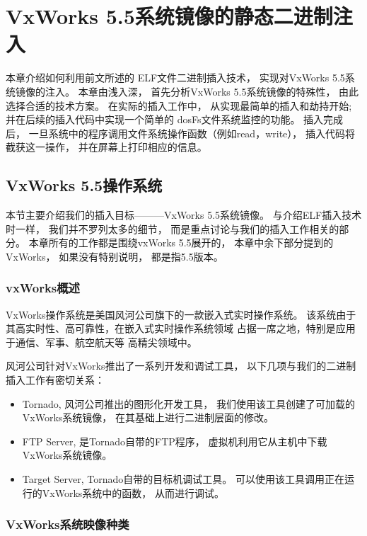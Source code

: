 \chapter{VxWorks 5.5系统镜像的静态二进制注入}

本章介绍如何利用前文所述的
ELF文件二进制插入技术，
实现对VxWorks 5.5系统镜像的注入。
本章由浅入深，
首先分析VxWorks 5.5系统镜像的特殊性，
由此选择合适的技术方案。
在实际的插入工作中，
从实现最简单的插入和劫持开始;
并在后续的插入代码中实现一个简单的
dosFs文件系统监控的功能。
插入完成后，
一旦系统中的程序调用文件系统操作函数（例如read，write），
插入代码将截获这一操作，
并在屏幕上打印相应的信息。


\section{VxWorks 5.5操作系统}

本节主要介绍我们的插入目标———VxWorks 5.5系统镜像。
与介绍ELF插入技术时一样，
我们并不罗列太多的细节，
而是重点讨论与我们的插入工作相关的部分。
本章所有的工作都是围绕vxWorks 5.5展开的，
本章中余下部分提到的VxWorks，
如果没有特别说明，
都是指5.5版本。


\subsection{vxWorks概述}

VxWorks操作系统是美国风河公司旗下的一款嵌入式实时操作系统。
该系统由于其高实时性、高可靠性，在嵌入式实时操作系统领域
占据一席之地，特别是应用于通信、军事、航空航天等
高精尖领域中。

风河公司针对VxWorks推出了一系列开发和调试工具，
以下几项与我们的二进制插入工作有密切关系：

\begin{itemize}
 \item Tornado, 风河公司推出的图形化开发工具，
我们使用该工具创建了可加载的VxWorks系统镜像，
在其基础上进行二进制层面的修改。
 \item FTP Server, 是Tornado自带的FTP程序，
虚拟机利用它从主机中下载VxWorks系统镜像。
 \item Target Server, Tornado自带的目标机调试工具。
可以使用该工具调用正在运行的VxWorks系统中的函数，
从而进行调试。
\end{itemize}


\subsection{VxWorks系统映像种类}

